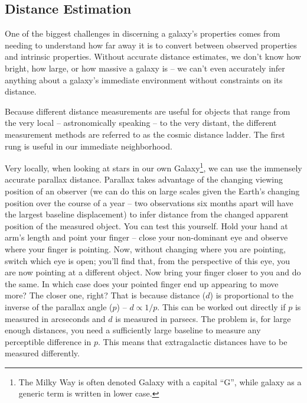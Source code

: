 \subsection{Distance Estimation}

One of the biggest challenges in discerning a galaxy's properties comes from needing to understand how far away it is to convert between observed properties and intrinsic properties. Without accurate distance estimates, we don't know how bright, how large, or how massive a galaxy is -- we can't even accurately infer anything about a galaxy's immediate environment without constraints on its distance.

Because different distance measurements are useful for objects that range from the very local -- astronomically speaking -- to the very distant, the different measurement methods are referred to as the cosmic distance ladder. The first rung is useful in our immediate neighborhood.

Very locally, when looking at stars in our own Galaxy\footnote{The Milky Way is often denoted Galaxy with a capital ``G'', while galaxy as a generic term is written in lower case.}, we can use the immensely accurate parallax distance. Parallax takes advantage of the changing viewing position of an observer (we can do this on large scales given the Earth's changing position over the course of a year -- two observations six months apart will have the largest baseline displacement) to infer distance from the changed apparent position of the measured object. You can test this yourself. Hold your hand at arm's length and point your finger -- close your non-dominant eye and observe where your finger is pointing. Now, without changing where you are pointing, switch which eye is open; you'll find that, from the perspective of this eye, you are now pointing at a different object. Now bring your finger closer to you and do the same. In which case does your pointed finger end up appearing to move more? The closer one, right? That is because distance ($d$) is proportional to the inverse of the parallax angle ($p$) -- $d \propto 1/p$. This can be worked out directly if $p$ is measured in arcseconds and $d$ is measured in parsecs. The problem is, for large enough distances, you need a sufficiently large baseline to measure any perceptible difference in $p$. This means that extragalactic distances have to be measured differently.

